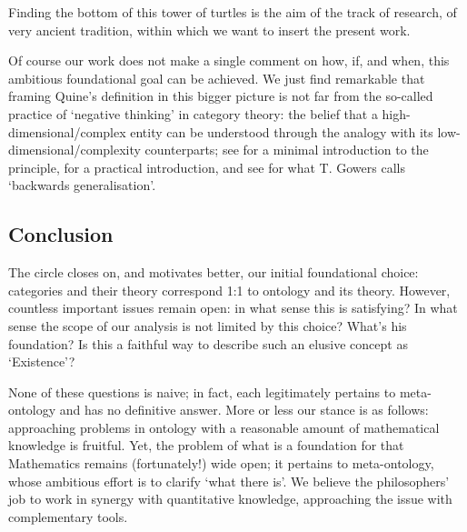 Finding the bottom of this tower of turtles is the aim of the track of research, of very ancient tradition, within which we want to insert the present work.

Of course our work does not make a single comment on how, if, and when, this ambitious foundational goal can be achieved. We just find remarkable that framing Quine's definition in this bigger picture is not far from the so-called practice of `negative thinking' in category theory: the belief that a high-dimensional/complex entity can be understood through the analogy with its low-dimensional/complexity counterparts; see \cite{nlab:category-order,nlab:neg-think} for a minimal introduction to the principle, \cite{baez2010lectures} for a practical introduction, and see \cite{gowers2007} for what T. Gowers calls `backwards generalisation'.
\subsection{Conclusion}
The circle closes on, and motivates better, our initial foundational choice: categories and their theory correspond 1:1 to ontology and its theory. However, countless important issues remain open: in what sense this is satisfying? In what sense the scope of our analysis is not limited by this choice? What's his foundation? Is this a faithful way to describe such an elusive concept as `Existence'?

None of these questions is naive; in fact, each legitimately pertains to meta-ontology and has no definitive answer. More or less our stance is as follows: approaching problems in ontology with a reasonable amount of mathematical knowledge is fruitful. Yet, the problem of what is a foundation for that Mathematics remains (fortunately!) wide open; it pertains to meta-ontology, whose ambitious effort is to clarify `what there is'. We believe the philosophers' job to work in synergy with quantitative knowledge, approaching the issue with complementary tools.